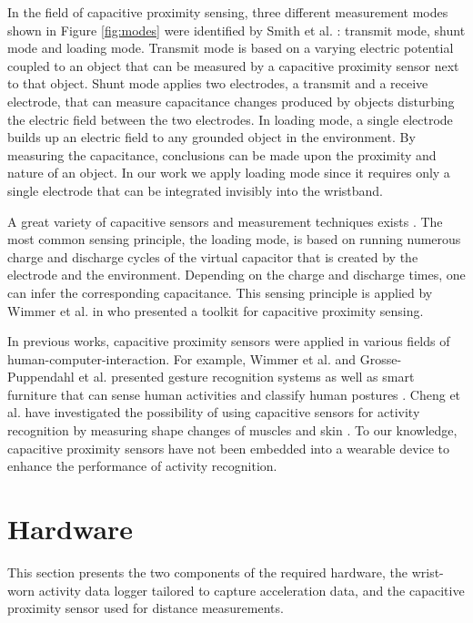 \documentclass[runningheads,a4paper]{llncs}
\begin{document}
In the field of capacitive proximity sensing, three different measurement modes shown in Figure \ref{fig:modes} were identified by Smith et al. \cite{Smith1999}: transmit mode, shunt mode and loading mode. Transmit mode is based on a varying electric potential coupled to an object that can be measured by a capacitive proximity sensor next to that object. Shunt mode applies two electrodes, a transmit and a receive electrode, that can measure capacitance changes produced by objects disturbing the electric field between the two electrodes. In loading mode, a single electrode builds up an electric field to any grounded object in the environment. By measuring the capacitance, conclusions can be made upon the proximity and nature of an object. In our work we apply loading mode since it requires only a single electrode that can be integrated invisibly into the wristband.

A great variety of capacitive sensors and measurement techniques exists \cite{Smith1999}. The most common sensing principle, the loading mode, is based on running numerous charge and discharge cycles of the virtual capacitor that is created by the electrode and the environment. Depending on the charge and discharge times, one can infer the corresponding capacitance. This sensing principle is applied by Wimmer et al. in \cite{Wimmer2007} who presented a toolkit for capacitive proximity sensing.

In previous works, capacitive proximity sensors were applied in various fields of human-computer-interaction. For example, Wimmer et al. and Grosse-Puppendahl et al. presented gesture recognition systems \cite{Wimmer,Grosse-puppendahl2012} as well as smart furniture that can sense human activities \cite{Wimmer} and classify human postures \cite{Grosse-puppendahl2011}. Cheng et al. have investigated the possibility of using capacitive sensors for activity recognition by measuring shape changes of muscles and skin \cite{Cheng2010}. To our knowledge, capacitive proximity sensors have not been embedded into a wearable device to enhance the performance of activity recognition.


\section{Hardware}
This section presents the two components of the required hardware, the wrist-worn activity data logger tailored to capture acceleration data, and the capacitive proximity sensor used for distance measurements.
\end{document}
